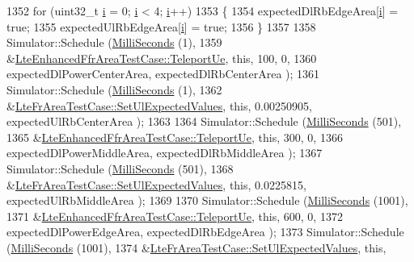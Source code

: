 \begin{DoxyCode}
1352   \textcolor{keywordflow}{for} (uint32\_t \hyperlink{bernuolliDistribution_8m_a6f6ccfcf58b31cb6412107d9d5281426}{i} = 0; \hyperlink{bernuolliDistribution_8m_a6f6ccfcf58b31cb6412107d9d5281426}{i} < 4; \hyperlink{bernuolliDistribution_8m_a6f6ccfcf58b31cb6412107d9d5281426}{i}++)
1353     \{
1354       expectedDlRbEdgeArea[\hyperlink{bernuolliDistribution_8m_a6f6ccfcf58b31cb6412107d9d5281426}{i}] = \textcolor{keyword}{true};
1355       expectedUlRbEdgeArea[\hyperlink{bernuolliDistribution_8m_a6f6ccfcf58b31cb6412107d9d5281426}{i}] = \textcolor{keyword}{true};
1356     \}
1357 
1358   Simulator::Schedule (\hyperlink{group__timecivil_gaf26127cf4571146b83a92ee18679c7a9}{MilliSeconds} (1),
1359                        &\hyperlink{classLteFrAreaTestCase_ad644210c338d4e34da3c5d7f0c511269}{LteEnhancedFfrAreaTestCase::TeleportUe}, \textcolor{keyword}{this},
       100, 0,
1360                        expectedDlPowerCenterArea, expectedDlRbCenterArea );
1361   Simulator::Schedule (\hyperlink{group__timecivil_gaf26127cf4571146b83a92ee18679c7a9}{MilliSeconds} (1),
1362                        &\hyperlink{classLteFrAreaTestCase_aac2718dc3703d2ad389f88ffa20d035e}{LteFrAreaTestCase::SetUlExpectedValues}, \textcolor{keyword}{this},
       0.00250905, expectedUlRbCenterArea );
1363 
1364   Simulator::Schedule (\hyperlink{group__timecivil_gaf26127cf4571146b83a92ee18679c7a9}{MilliSeconds} (501),
1365                        &\hyperlink{classLteFrAreaTestCase_ad644210c338d4e34da3c5d7f0c511269}{LteEnhancedFfrAreaTestCase::TeleportUe}, \textcolor{keyword}{this},
       300, 0,
1366                        expectedDlPowerMiddleArea, expectedDlRbMiddleArea );
1367   Simulator::Schedule (\hyperlink{group__timecivil_gaf26127cf4571146b83a92ee18679c7a9}{MilliSeconds} (501),
1368                        &\hyperlink{classLteFrAreaTestCase_aac2718dc3703d2ad389f88ffa20d035e}{LteFrAreaTestCase::SetUlExpectedValues}, \textcolor{keyword}{this},
       0.0225815, expectedUlRbMiddleArea );
1369 
1370   Simulator::Schedule (\hyperlink{group__timecivil_gaf26127cf4571146b83a92ee18679c7a9}{MilliSeconds} (1001),
1371                        &\hyperlink{classLteFrAreaTestCase_ad644210c338d4e34da3c5d7f0c511269}{LteEnhancedFfrAreaTestCase::TeleportUe}, \textcolor{keyword}{this},
       600, 0,
1372                        expectedDlPowerEdgeArea, expectedDlRbEdgeArea );
1373   Simulator::Schedule (\hyperlink{group__timecivil_gaf26127cf4571146b83a92ee18679c7a9}{MilliSeconds} (1001),
1374                        &\hyperlink{classLteFrAreaTestCase_aac2718dc3703d2ad389f88ffa20d035e}{LteFrAreaTestCase::SetUlExpectedValues}, \textcolor{keyword}{this},

\end{DoxyCode}
